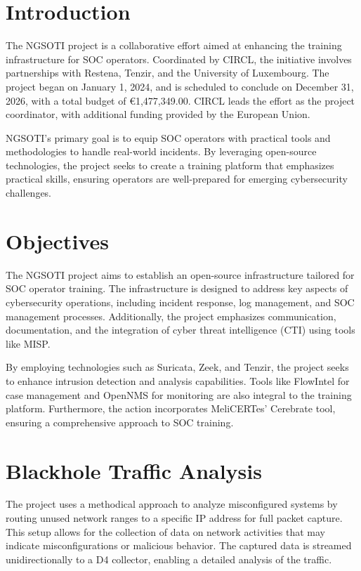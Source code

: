 \documentclass[10pt,a4paper]{report}
\begin{document}
\tableofcontents

\chapter{Introduction}
The NGSOTI project is a collaborative effort aimed at enhancing the training infrastructure for SOC operators. Coordinated by CIRCL, the initiative involves partnerships with Restena, Tenzir, and the University of Luxembourg. The project began on January 1, 2024, and is scheduled to conclude on December 31, 2026, with a total budget of €1,477,349.00. CIRCL leads the effort as the project coordinator, with additional funding provided by the European Union.

NGSOTI's primary goal is to equip SOC operators with practical tools and methodologies to handle real-world incidents. By leveraging open-source technologies, the project seeks to create a training platform that emphasizes practical skills, ensuring operators are well-prepared for emerging cybersecurity challenges.

\chapter{Objectives}
The NGSOTI project aims to establish an open-source infrastructure tailored for SOC operator training. The infrastructure is designed to address key aspects of cybersecurity operations, including incident response, log management, and SOC management processes. Additionally, the project emphasizes communication, documentation, and the integration of cyber threat intelligence (CTI) using tools like MISP.

By employing technologies such as Suricata, Zeek, and Tenzir, the project seeks to enhance intrusion detection and analysis capabilities. Tools like FlowIntel for case management and OpenNMS for monitoring are also integral to the training platform. Furthermore, the action incorporates MeliCERTes' Cerebrate tool, ensuring a comprehensive approach to SOC training.

\chapter{Blackhole Traffic Analysis}
The project uses a methodical approach to analyze misconfigured systems by routing unused network ranges to a specific IP address for full packet capture. This setup allows for the collection of data on network activities that may indicate misconfigurations or malicious behavior. The captured data is streamed unidirectionally to a D4 collector, enabling a detailed analysis of the traffic.
\end{document}
